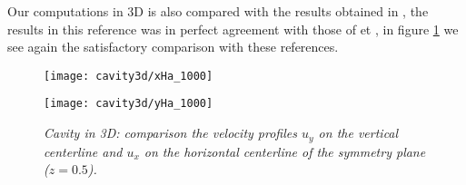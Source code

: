 Our computations in 3D is also compared with the results obtained in \cite{Hac10}, the results in this reference was in perfect agreement with those of \cite{Tang95} et \cite{Yang98}, in figure \ref{Ha} we see again the satisfactory comparison with these references.
\begin{figure}[htbp]
\begin{minipage}[b]{0.5\textwidth}
\centering
\texttt{[image: cavity3d/xHa\_1000]}
\end{minipage}
\hfill
\begin{minipage}[b]{0.5\textwidth}
\centering
\texttt{[image: cavity3d/yHa\_1000]}
\end{minipage}
\caption{\em Cavity in 3D: comparison the velocity profiles $u_y$ on the vertical centerline and $u_x$ on the horizontal centerline of the symmetry plane ($z=0.5$).}\label{Ha}
\end{figure}

